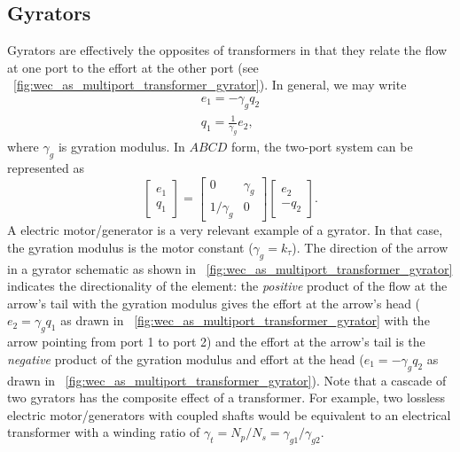 \documentclass[lettersize,journal]{IEEEtran}
\begin{document}
\subsection{Gyrators}\label{sec:gyrators}
Gyrators are effectively the opposites of transformers in that they relate the flow at one port to the effort at the other port (see \figurename~\ref{fig:wec_as_multiport_transformer_gyrator}).
In general, we may write
%
\begin{subequations}
        \begin{align}
               e_1 = - \gamma_g q_2 \\
               q_1 = \frac{1}{\gamma_g} e_2 ,
        \end{align}
        \label{eq:gyrator_eom}%
\end{subequations}
%
where $\gamma_g$ is gyration modulus.
In $ABCD$ form, the two-port system can be represented as
%
\begin{equation}
        \begin{bmatrix}
                e_1 \\ q_1
        \end{bmatrix}
        =
        \begin{bmatrix}
                0 & \gamma_g \\ 1/\gamma_g & 0
        \end{bmatrix}
        \begin{bmatrix}
                e_2 \\ - q_2
        \end{bmatrix} .
        \label{eq:gyrator_abcd}
\end{equation}
%
A electric motor/generator is a very relevant example of a gyrator.
In that case, the gyration modulus is the motor constant ($\gamma_g=k_\tau$).
The direction of the arrow in a gyrator schematic as shown in \figurename~\ref{fig:wec_as_multiport_transformer_gyrator} indicates the directionality of the element: the \emph{positive} product of the flow at the arrow's tail with the gyration modulus gives the effort at the arrow's head ($e_2 = \gamma_g q_1$ as drawn in \figurename~\ref{fig:wec_as_multiport_transformer_gyrator} with the arrow pointing from port 1 to port 2) and the effort at the arrow's tail is the \emph{negative} product of the gyration modulus and effort at the head ($e_1= - \gamma_g q_2$ as drawn in \figurename~\ref{fig:wec_as_multiport_transformer_gyrator}).
Note that a cascade of two gyrators has the composite effect of a transformer.
For example, two lossless electric motor/generators with coupled shafts would be equivalent to an electrical transformer with a winding ratio of $\gamma_t=N_p/N_s=\gamma_{g1}/\gamma_{g2}$.
\end{document}
